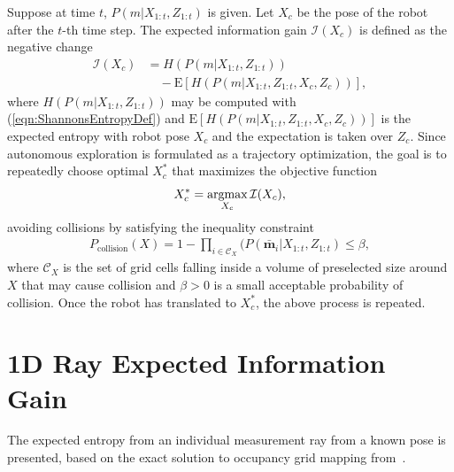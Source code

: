 \documentclass[letterpaper, 10pt, conference]{ieeeconf}
\newcommand{\refeqn}[1]{(\ref{eqn:#1})}
\newcommand{\argmax}{\operatornamewithlimits{argmax}}
\begin{document}
Suppose at time $t$, $P(m|X_{1:t},Z_{1:t})$ is given. Let $X_c$ be the pose of the robot after the $t$-th time step.
The expected information gain $\mathcal I(X_c)$ is defined as the negative change
\begin{align}
\label{eqn:ObjFun}
\mathcal I(X_c)&=H(P(m|X_{1:t},Z_{1:t}))\nonumber\\&\quad-\text{E}\left[H(P(m|X_{1:t},Z_{1:t},X_c,Z_c))\right],
\end{align}
where $H(P(m|X_{1:t},Z_{1:t}))$ may be computed with \refeqn{ShannonsEntropyDef} and $\text{E}\left[H(P(m|X_{1:t},Z_{1:t},X_c,Z_c))\right]$ is the expected entropy with robot pose $X_c$ and the expectation is taken over $Z_c$.
Since autonomous exploration is formulated as a trajectory optimization, the goal is to repeatedly choose optimal $X_c^*$ that maximizes the objective function
\begin{align}
\label{eqn:Objective}
X_c^*=\argmax_{X_c}{\mathcal I(X_c)},
\end{align}
avoiding collisions by satisfying the inequality constraint
\begin{align}
\label{eqn:CollisionInequalityConstraint}
P_\text{collision}(X)=1-\prod_{i\in\mathcal C_X}(P(\bar{\mathbf{m}}_i|X_{1:t},Z_{1:t})\leq\beta,
\end{align}
where $\mathcal C_X$ is the set of grid cells falling inside a volume of preselected size around $X$ that may cause collision and $\beta>0$ is a small acceptable probability of collision.
Once the robot has translated to $X_c^*$, the above process is repeated.


\section{1D Ray Expected Information Gain}

The expected entropy from an individual measurement ray from a known pose is presented, based on the exact solution to occupancy grid mapping from~\cite{KauLeeAiMos16}.
\end{document}
